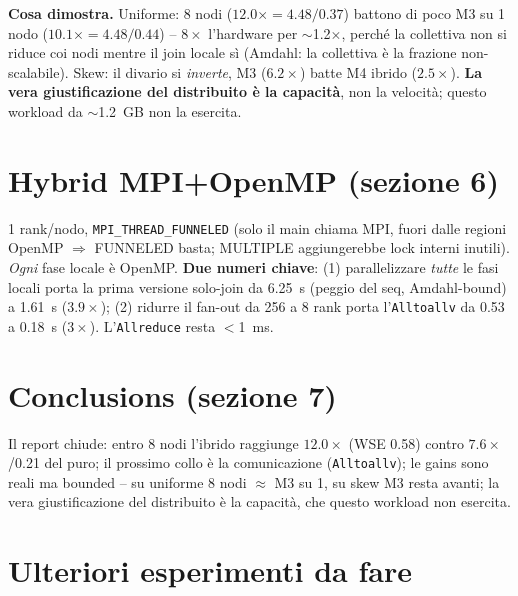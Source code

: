 \documentclass[11pt,a4paper]{article}
\begin{document}
\begin{difesa}
\textbf{Cosa dimostra.} Uniforme: 8 nodi ($12.0\times=4.48/0.37$) battono di poco M3 su 1 nodo ($10.1\times=4.48/0.44$) -- $8\times$ l'hardware per $\sim$1.2$\times$, perché la collettiva non si riduce coi nodi mentre il join locale sì (Amdahl: la collettiva è la frazione non-scalabile). Skew: il divario si \emph{inverte}, M3 ($6.2\times$) batte M4 ibrido ($2.5\times$). \textbf{La vera giustificazione del distribuito è la capacità}, non la velocità; questo workload da $\sim$1.2~GB non la esercita.
\end{difesa}

\section{Hybrid MPI+OpenMP (sezione 6)}

\begin{motiv}
1 rank/nodo, \texttt{MPI\_THREAD\_FUNNELED} (solo il main chiama MPI, fuori dalle regioni OpenMP $\Rightarrow$ FUNNELED basta; MULTIPLE aggiungerebbe lock interni inutili). \emph{Ogni} fase locale è OpenMP. \textbf{Due numeri chiave}: (1) parallelizzare \emph{tutte} le fasi locali porta la prima versione solo-join da 6.25~s (peggio del seq, Amdahl-bound) a 1.61~s ($3.9\times$); (2) ridurre il fan-out da 256 a 8 rank porta l'\texttt{Alltoallv} da 0.53 a 0.18~s ($3\times$). L'\texttt{Allreduce} resta $<$1~ms.
\end{motiv}

\section{Conclusions (sezione 7)}

Il report chiude: entro 8 nodi l'ibrido raggiunge $12.0\times$ (WSE 0.58) contro $7.6\times$/0.21 del puro; il prossimo collo è la comunicazione (\texttt{Alltoallv}); le gains sono reali ma bounded -- su uniforme 8 nodi $\approx$ M3 su 1, su skew M3 resta avanti; la vera giustificazione del distribuito è la capacità, che questo workload non esercita.

\section{Ulteriori esperimenti da fare}
\end{document}
